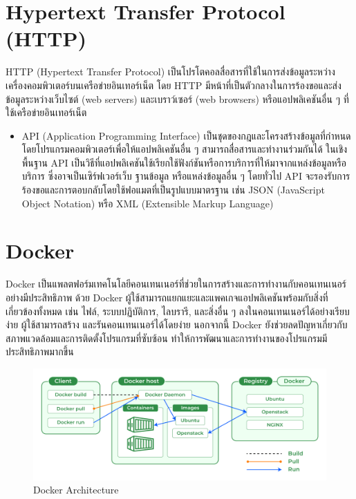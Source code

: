 \section{Hypertext Transfer Protocol (HTTP)}
HTTP (Hypertext Transfer Protocol) เป็นโปรโตคอลสื่อสารที่ใช้ในการส่งข้อมูลระหว่างเครื่องคอมพิวเตอร์บนเครือข่ายอินเทอร์เน็ต โดย HTTP 
มีหน้าที่เป็นตัวกลางในการร้องขอและส่งข้อมูลระหว่างเว็บไซต์ (web servers) และเบราว์เซอร์ (web browsers) หรือแอปพลิเคชันอื่น ๆ 
ที่ใช้เครือข่ายอินเทอร์เน็ต 
\begin{itemize}
  \item API (Application Programming Interface) เป็นชุดของกฎและโครงสร้างข้อมูลที่กำหนดโดยโปรแกรมคอมพิวเตอร์เพื่อให้แอปพลิเคชันอื่น ๆ 
  สามารถสื่อสารและทำงานร่วมกันได้ ในเชิงพื้นฐาน API เป็นวิธีที่แอปพลิเคชันใช้เรียกใช้ฟังก์ชันหรือการบริการที่ให้มาจากแหล่งข้อมูลหรือบริการ
  ซึ่งอาจเป็นเซิร์ฟเวอร์เว็บ ฐานข้อมูล หรือแหล่งข้อมูลอื่น ๆ โดยทั่วไป API จะรองรับการร้องขอและการตอบกลับโดยใช้ฟอแมตที่เป็นรูปแบบมาตรฐาน เช่น 
  JSON (JavaScript Object Notation) หรือ XML (Extensible Markup Language) 
\end{itemize}

\section{Docker}
Docker \cite{docker} เป็นแพลตฟอร์มเทคโนโลยีคอนเทนเนอร์ที่ช่วยในการสร้างและการทำงานกับคอนเทนเนอร์อย่างมีประสิทธิภาพ ด้วย Docker 
ผู้ใช้สามารถแยกแยะและแพคเกจแอปพลิเคชันพร้อมกับสิ่งที่เกี่ยวข้องทั้งหมด เช่น ไฟล์, ระบบปฏิบัติการ, ไลบรารี, และสิ่งอื่น ๆ 
ลงในคอนเทนเนอร์ได้อย่างเรียบง่าย ผู้ใช้สามารถสร้าง และรันคอนเทนเนอร์ได้โดยง่าย นอกจากนี้ Docker 
ยังช่วยลดปัญหาเกี่ยวกับสภาพแวดล้อมและการติดตั้งโปรแกรมที่ซับซ้อน ทำให้การพัฒนาและการทำงานของโปรแกรมมีประสิทธิภาพมากขึ้น 
\begin{figure}[h]
  \begin{center}
  \includegraphics[scale=0.3]{resources/Docker.png}
  \end{center}
  \caption[Docker Architecture]{Docker Architecture}
  \label{fig:docker}
\end{figure}

